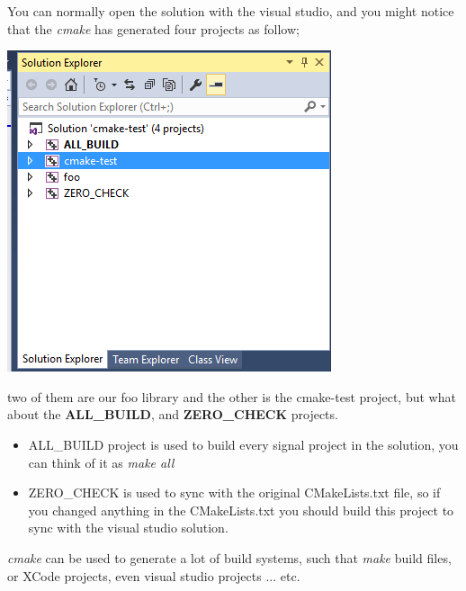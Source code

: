 \documentclass{article}
\begin{document}
You can normally open the solution with the visual studio, and you might notice that the \textit{cmake} has generated four projects as follow;
\begin{center}
\includegraphics[scale=0.65]{./resources/imgs/cmake/openin-vs2015.PNG}
\end{center}
two of them are our foo library and the other is the cmake-test project, but what about the \textbf{ALL\_BUILD}, and \textbf{ZERO\_CHECK} projects.

\begin{itemize}
    \item ALL\_BUILD project is used to build every signal project in the solution, you can think of it as \textit{make all}
    \item ZERO\_CHECK is used to sync with the original CMakeLists.txt file, so if you changed anything in the CMakeLists.txt you should build this project to sync with the visual studio solution.
\end{itemize}

\textit{cmake} can be used to generate a lot of build systems, such that \textit{make} build files, or XCode projects, even visual studio projects ... etc.
\end{document}
